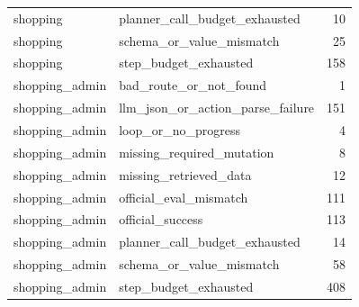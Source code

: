 \begin{tabular}{llr}
shopping & planner_call_budget_exhausted & 10 \\
shopping & schema_or_value_mismatch & 25 \\
shopping & step_budget_exhausted & 158 \\
shopping_admin & bad_route_or_not_found & 1 \\
shopping_admin & llm_json_or_action_parse_failure & 151 \\
shopping_admin & loop_or_no_progress & 4 \\
shopping_admin & missing_required_mutation & 8 \\
shopping_admin & missing_retrieved_data & 12 \\
shopping_admin & official_eval_mismatch & 111 \\
shopping_admin & official_success & 113 \\
shopping_admin & planner_call_budget_exhausted & 14 \\
shopping_admin & schema_or_value_mismatch & 58 \\
shopping_admin & step_budget_exhausted & 408 \\
\bottomrule
\end{tabular}
